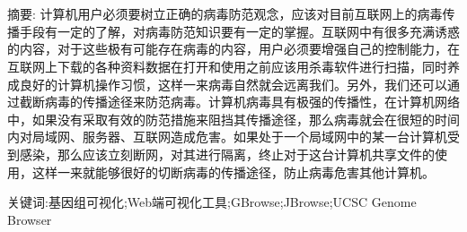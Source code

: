 \chapter*{\LARGE \heiti \thtopic}

\vspace{1em}
{\normalsize \heiti 摘要: }{\small \songti 
		计算机用户必须要树立正确的病毒防范观念，应该对目前互联网上的病毒传播手段有一定的了解，对病毒防范知识要有一定的掌握。互联网中有很多充满诱惑的内容，对于这些极有可能存在病毒的内容，用户必须要增强自己的控制能力，在互联网上下载的各种资料数据在打开和使用之前应该用杀毒软件进行扫描，同时养成良好的计算机操作习惯，这样一来病毒自然就会远离我们。另外，我们还可以通过截断病毒的传播途径来防范病毒。计算机病毒具有极强的传播性，在计算机网络中，如果没有采取有效的防范措施来阻挡其传播途径，那么病毒就会在很短的时间内对局域网、服务器、互联网造成危害。如果处于一个局域网中的某一台计算机受到感染，那么应该立刻断网，对其进行隔离，终止对于这台计算机共享文件的使用，这样一来就能够很好的切断病毒的传播途径，防止病毒危害其他计算机。
}

{\normalsize \heiti 关键词:}{\small 基因组可视化;Web端可视化工具;GBrowse;JBrowse;UCSC Genome Browser}
\thispagestyle{empty}